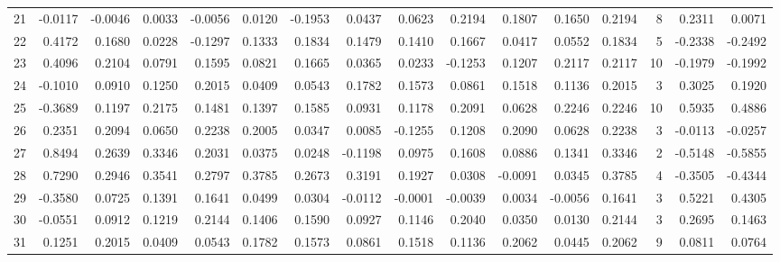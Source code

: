 \begin{tabular}{lrrrrrrrrrrrrrrr}
21  &     -0.0117 & -0.0046 &  0.0033 & -0.0056 &  0.0120 & -0.1953 &  0.0437 &  0.0623 &  0.2194 &  0.1807 &   0.1650 &     0.2194 &      8 &                    0.2311 &                     0.0071 \\
22  &      0.4172 &  0.1680 &  0.0228 & -0.1297 &  0.1333 &  0.1834 &  0.1479 &  0.1410 &  0.1667 &  0.0417 &   0.0552 &     0.1834 &      5 &                   -0.2338 &                    -0.2492 \\
23  &      0.4096 &  0.2104 &  0.0791 &  0.1595 &  0.0821 &  0.1665 &  0.0365 &  0.0233 & -0.1253 &  0.1207 &   0.2117 &     0.2117 &     10 &                   -0.1979 &                    -0.1992 \\
24  &     -0.1010 &  0.0910 &  0.1250 &  0.2015 &  0.0409 &  0.0543 &  0.1782 &  0.1573 &  0.0861 &  0.1518 &   0.1136 &     0.2015 &      3 &                    0.3025 &                     0.1920 \\
25  &     -0.3689 &  0.1197 &  0.2175 &  0.1481 &  0.1397 &  0.1585 &  0.0931 &  0.1178 &  0.2091 &  0.0628 &   0.2246 &     0.2246 &     10 &                    0.5935 &                     0.4886 \\
26  &      0.2351 &  0.2094 &  0.0650 &  0.2238 &  0.2005 &  0.0347 &  0.0085 & -0.1255 &  0.1208 &  0.2090 &   0.0628 &     0.2238 &      3 &                   -0.0113 &                    -0.0257 \\
27  &      0.8494 &  0.2639 &  0.3346 &  0.2031 &  0.0375 &  0.0248 & -0.1198 &  0.0975 &  0.1608 &  0.0886 &   0.1341 &     0.3346 &      2 &                   -0.5148 &                    -0.5855 \\
28  &      0.7290 &  0.2946 &  0.3541 &  0.2797 &  0.3785 &  0.2673 &  0.3191 &  0.1927 &  0.0308 & -0.0091 &   0.0345 &     0.3785 &      4 &                   -0.3505 &                    -0.4344 \\
29  &     -0.3580 &  0.0725 &  0.1391 &  0.1641 &  0.0499 &  0.0304 & -0.0112 & -0.0001 & -0.0039 &  0.0034 &  -0.0056 &     0.1641 &      3 &                    0.5221 &                     0.4305 \\
30  &     -0.0551 &  0.0912 &  0.1219 &  0.2144 &  0.1406 &  0.1590 &  0.0927 &  0.1146 &  0.2040 &  0.0350 &   0.0130 &     0.2144 &      3 &                    0.2695 &                     0.1463 \\
31  &      0.1251 &  0.2015 &  0.0409 &  0.0543 &  0.1782 &  0.1573 &  0.0861 &  0.1518 &  0.1136 &  0.2062 &   0.0445 &     0.2062 &      9 &                    0.0811 &                     0.0764 \\

\end{tabular}
